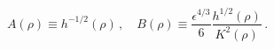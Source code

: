 \begin{equation}
A(\rho)\equiv h^{-1/2}(\rho)\,,\quad B(\rho)\equiv \frac{\epsilon^{4/3}}{6} \frac{h^{1/2}(\rho)}
{K^2(\rho)}\,.
\end{equation}

